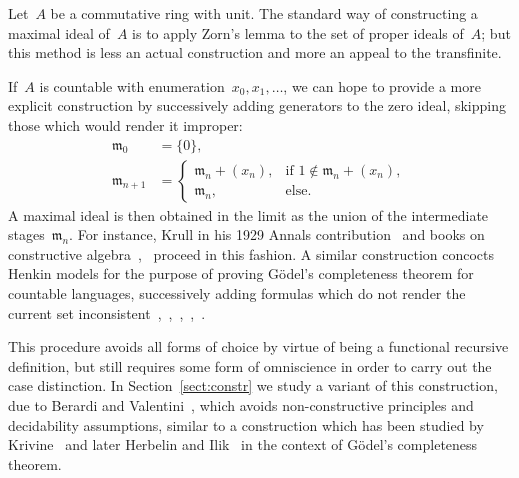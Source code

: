 \documentclass[com,11pt,crcready]{iosart2x}
\theoremstyle{definition}
\theoremstyle{plain}
\theoremstyle{remark}
\newcommand{\?}{\,{:}\,}
\newcommand{\mmm}{\mathfrak{m}}
\renewcommand{\_}{\mathpunct{.}\,}
\begin{document}
\begin{frontmatter}
\begin{keyword}
\end{keyword}

\end{frontmatter}

\noindent
Let~$A$ be a commutative ring with unit. The standard way of constructing a
maximal ideal of~$A$ is to apply Zorn's lemma to the set of proper ideals
of~$A$; but this method is less an actual construction and more an appeal to
the transfinite.

If~$A$ is countable with enumeration~$x_0,x_1,\ldots$, we can hope to provide a
more explicit construction by successively adding generators to the zero ideal,
skipping those which would render it improper:
\begin{equation}\label{eq:orig-construction}
  \tag{$\star$}\begin{aligned}
  \mmm_0 &= \{ 0 \}, \\
  \mmm_{n+1} &= \begin{cases}
    \mmm_n + (x_n), & \text{if $1 \not\in \mmm_n + (x_n)$}, \\
    \mmm_n, & \text{else.}
  \end{cases}
\end{aligned}\end{equation}
A maximal ideal is then obtained in the limit as the union of the intermediate
stages~$\mmm_n$. For instance, Krull in his 1929 Annals contribution~\cite[Hilfs\-satz]{krull:ohne} and books on constructive
algebra~\cite[Lemma~VI.3.2]{mines-richman-ruitenburg:constructive-algebra},~\cite[comment after Theorem~VII.5.2]{lombardi-quitte:constructive-algebra} proceed in this fashion.
A similar
construction concocts Henkin models for the purpose of proving
Gödel's completeness theorem for countable languages, successively adding
formulas which do not render the current set
inconsistent~\cite[Satz~I.56]{tarski:fundamental},~\cite[Lemma~1.5.7]{dalen:logic},~\cite[Lemma~III.5.4]{simpson:subsystems},~\cite[Lemma~2.1]{ishihara-khoussainov-nerode:decidable-kripke-models},~\cite[Section~A.4]{coquand-lombardi:hidden-krull}.

This procedure avoids all forms of choice by virtue of being a
functional recursive definition, but still requires some form of omniscience in
order to carry out the case distinction.
In Section~\ref{sect:constr} we study a variant of this construction, due to Berardi and
Valentini~\cite{berardi-valentini:krivine}, which
avoids non-constructive principles and decidability assumptions, similar to
a construction which has been studied by
Krivine~\cite[p.~410]{krivine:completeness} and later Herbelin and
Ilik~\cite[p.~11]{herbelin-ilik:henkin} in the
context of Gödel's completeness theorem.
\end{document}

